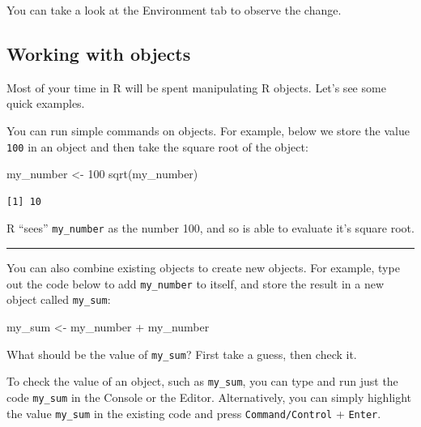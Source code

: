 \documentclass[
  letterpaper,
  DIV=11,
  numbers=noendperiod]{scrreprt}
\newenvironment{Shaded}{\begin{snugshade}}{\end{snugshade}}
\newcommand{\DecValTok}[1]{\textcolor[rgb]{0.68,0.00,0.00}{#1}}
\newcommand{\FunctionTok}[1]{\textcolor[rgb]{0.28,0.35,0.67}{#1}}
\newcommand{\NormalTok}[1]{\textcolor[rgb]{0.00,0.23,0.31}{#1}}
\newcommand{\OtherTok}[1]{\textcolor[rgb]{0.00,0.23,0.31}{#1}}
\newcommand{\SpecialCharTok}[1]{\textcolor[rgb]{0.37,0.37,0.37}{#1}}
\begin{document}
You can take a look at the Environment tab to observe the change.

\hypertarget{working-with-objects}{%
\subsection{Working with objects}\label{working-with-objects}}

Most of your time in R will be spent manipulating R objects. Let's see
some quick examples.

You can run simple commands on objects. For example, below we store the
value \texttt{100} in an object and then take the square root of the
object:

\begin{Shaded}
\begin{Highlighting}[]
\NormalTok{my\_number }\OtherTok{\textless{}{-}} \DecValTok{100}
\FunctionTok{sqrt}\NormalTok{(my\_number)}
\end{Highlighting}
\end{Shaded}

\begin{verbatim}
[1] 10
\end{verbatim}

R ``sees'' \texttt{my\_number} as the number 100, and so is able to
evaluate it's square root.

\begin{center}\rule{0.5\linewidth}{0.5pt}\end{center}

You can also combine existing objects to create new objects. For
example, type out the code below to add \texttt{my\_number} to itself,
and store the result in a new object called \texttt{my\_sum}:

\begin{Shaded}
\begin{Highlighting}[]
\NormalTok{my\_sum }\OtherTok{\textless{}{-}}\NormalTok{ my\_number }\SpecialCharTok{+}\NormalTok{ my\_number}
\end{Highlighting}
\end{Shaded}

What should be the value of \texttt{my\_sum}? First take a guess, then
check it.

\begin{tcolorbox}[enhanced jigsaw, colframe=quarto-callout-note-color-frame, rightrule=.15mm, opacityback=0, breakable, coltitle=black, colbacktitle=quarto-callout-note-color!10!white, bottomrule=.15mm, leftrule=.75mm, toprule=.15mm, arc=.35mm, bottomtitle=1mm, colback=white, left=2mm, opacitybacktitle=0.6, titlerule=0mm, title=\textcolor{quarto-callout-note-color}{\faInfo}\hspace{0.5em}{Side Note}, toptitle=1mm]

To check the value of an object, such as \texttt{my\_sum}, you can type
and run just the code \texttt{my\_sum} in the Console or the Editor.
Alternatively, you can simply highlight the value \texttt{my\_sum} in
the existing code and press \texttt{Command/Control} + \texttt{Enter}.

\end{tcolorbox}
\end{document}
